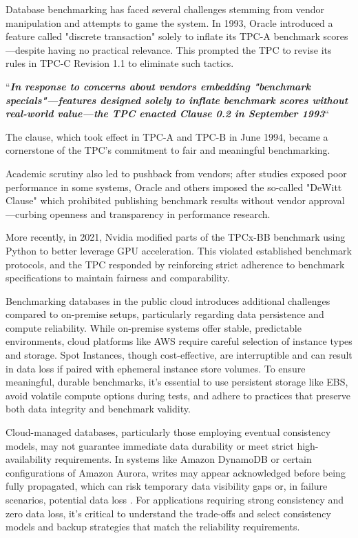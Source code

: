 Database benchmarking has faced several challenges stemming from vendor manipulation and attempts to game the system. In 1993, Oracle introduced a feature called "discrete transaction" \cite{Shanley1998TPCOrigin} solely to inflate its TPC-A benchmark scores—despite having no practical relevance. This prompted the TPC to revise its rules in TPC-C Revision 1.1 to eliminate such tactics. 

“\textit{\textbf{In response to concerns about vendors embedding "benchmark specials"—features designed solely to inflate benchmark scores without real-world value—the TPC enacted Clause 0.2 in September 1993}}“

The clause, which took effect in TPC-A and TPC-B in June 1994, became a cornerstone of the TPC’s commitment to fair and meaningful benchmarking. 

Academic scrutiny also led to pushback from vendors; after studies exposed poor performance in some systems, Oracle and others imposed the so-called "DeWitt Clause"\cite{wikipedia-DavidDeWitt} which prohibited publishing benchmark results without vendor approval—curbing openness and transparency in performance research. 

More recently, in 2021, Nvidia \cite{Quach2021Nvidia-tweaked-TPCx-BB} modified parts of the TPCx-BB benchmark using Python to better leverage GPU acceleration. This violated established benchmark protocols, and the TPC responded by reinforcing strict adherence to benchmark specifications to maintain fairness and comparability.

Benchmarking databases in the public cloud introduces additional challenges compared to on-premise setups, particularly regarding data persistence and compute reliability. While on-premise systems offer stable, predictable environments, cloud platforms like AWS require careful selection of instance types and storage. Spot Instances\cite{Busser2023AmazonEc2SpotBestPractices}, though cost-effective, are interruptible and can result in data loss if paired with ephemeral instance store volumes. To ensure meaningful, durable benchmarks, it’s essential to use persistent storage \cite{Amazon-DataPersistence} like EBS, avoid volatile compute options during tests, and adhere to practices that preserve both data integrity and benchmark validity.

Cloud-managed databases, particularly those employing eventual consistency models, may not guarantee immediate data durability or meet strict high-availability requirements. In systems like Amazon DynamoDB or certain configurations of Amazon Aurora, writes may appear acknowledged before being fully propagated, which can risk temporary data visibility gaps or, in failure scenarios, potential data loss \cite{Amazon-WhatisNoSQL}. For applications requiring strong consistency and zero data loss, it’s critical to understand the trade-offs and select consistency models and backup strategies that match the reliability requirements.

